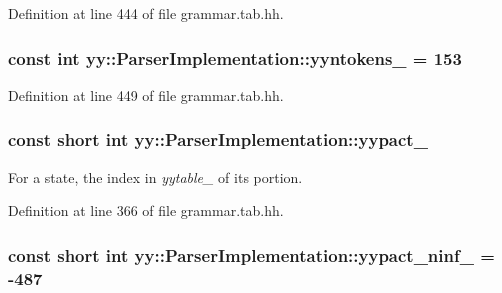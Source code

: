 Definition at line 444 of file grammar.tab.hh.

\hypertarget{classyy_1_1_parser_implementation_a919348059068292e27619af10fb47779}{
\subsubsection[{yyntokens\_\-}]{\setlength{\rightskip}{0pt plus 5cm}const int {\bf yy::ParserImplementation::yyntokens\_\-} = 153}}
\label{classyy_1_1_parser_implementation_a919348059068292e27619af10fb47779}


Definition at line 449 of file grammar.tab.hh.

\hypertarget{classyy_1_1_parser_implementation_a7401cd87b869c3bf46fb2c1eded0e01b}{
\subsubsection[{yypact\_\-}]{\setlength{\rightskip}{0pt plus 5cm}const short int {\bf yy::ParserImplementation::yypact\_\-}}}
\label{classyy_1_1_parser_implementation_a7401cd87b869c3bf46fb2c1eded0e01b}


For a state, the index in {\itshape yytable\_\-\/} of its portion. 



Definition at line 366 of file grammar.tab.hh.

\hypertarget{classyy_1_1_parser_implementation_a85c960935be420c72af16a0400681917}{
\subsubsection[{yypact\_\-ninf\_\-}]{\setlength{\rightskip}{0pt plus 5cm}const short int {\bf yy::ParserImplementation::yypact\_\-ninf\_\-} = -\/487}}
\label{classyy_1_1_parser_implementation_a85c960935be420c72af16a0400681917}


